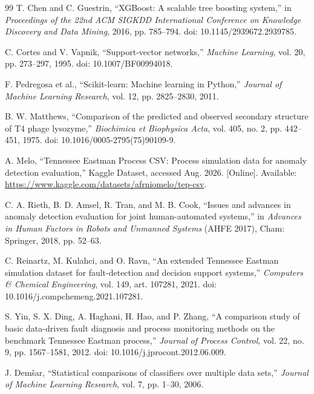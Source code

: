 \documentclass[12pt,a4paper]{article}
\begin{document}
\begin{thebibliography}{99}
T. Chen and C. Guestrin,
``XGBoost: A scalable tree boosting system,'' in \emph{Proceedings of the 22nd
ACM SIGKDD International Conference on Knowledge Discovery and Data Mining},
2016, pp. 785--794. doi: 10.1145/2939672.2939785.

C. Cortes and V. Vapnik, ``Support-vector networks,'' \emph{Machine Learning},
vol. 20, pp. 273--297, 1995. doi: 10.1007/BF00994018.

F. Pedregosa et al., ``Scikit-learn: Machine learning in Python,''
\emph{Journal of Machine Learning Research}, vol. 12, pp. 2825--2830, 2011.

B. W. Matthews, ``Comparison of the predicted and observed secondary structure
of T4 phage lysozyme,'' \emph{Biochimica et Biophysica Acta}, vol. 405, no. 2,
pp. 442--451, 1975. doi: 10.1016/0005-2795(75)90109-9.

A. Melo,
``Tennessee Eastman Process CSV: Process simulation data for anomaly detection
evaluation,'' Kaggle Dataset, accessed Aug. 2026. [Online]. Available:
\url{https://www.kaggle.com/datasets/afrniomelo/tep-csv}.


C. A. Rieth, B. D. Amsel, R. Tran, and M. B. Cook,
``Issues and advances in anomaly detection evaluation for joint
human-automated systems,'' in \emph{Advances in Human Factors in Robots and
Unmanned Systems} (AHFE 2017), Cham: Springer, 2018, pp. 52--63.

C. Reinartz, M. Kulahci, and O. Ravn,
``An extended Tennessee Eastman simulation dataset for fault-detection and
decision support systems,'' \emph{Computers \& Chemical Engineering}, vol. 149,
art. 107281, 2021. doi: 10.1016/j.compchemeng.2021.107281.

S. Yin, S. X. Ding, A. Haghani, H. Hao, and P. Zhang,
``A comparison study of basic data-driven fault diagnosis and process
monitoring methods on the benchmark Tennessee Eastman process,''
\emph{Journal of Process Control}, vol. 22, no. 9, pp. 1567--1581, 2012.
doi: 10.1016/j.jprocont.2012.06.009.

J. Dem\v{s}ar, ``Statistical comparisons of classifiers over multiple data
sets,'' \emph{Journal of Machine Learning Research}, vol. 7, pp. 1--30, 2006.


\end{thebibliography}
\end{document}
